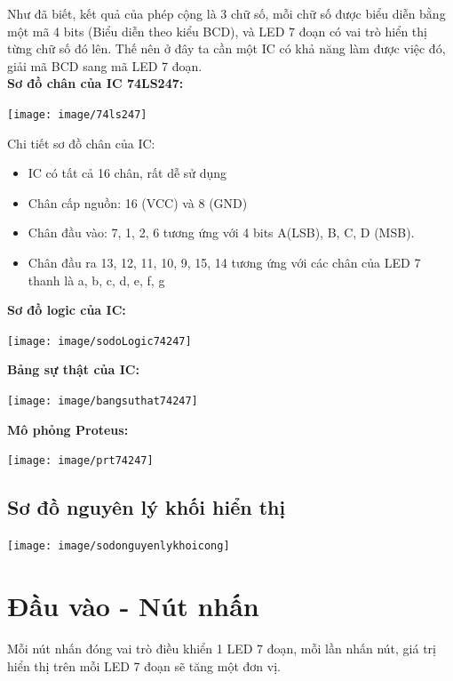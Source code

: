 \documentclass[10pt,a4paper]{report}
\begin{document}
Như đã biết, kết quả của phép cộng là 3 chữ số, mỗi chữ số được biểu diễn bằng một mã 4 bits (Biểu diễn theo kiểu BCD), và LED 7 đoạn có vai trò hiển thị từng chữ số đó lên. Thế nên ở đây ta cần một IC có khả năng làm được việc đó, giải mã BCD sang mã LED 7 đoạn.\\

\textbf{Sơ đồ chân của IC 74LS247:}
\begin{center}
	\texttt{[image: image/74ls247]}
\end{center}

Chi tiết sơ đồ chân của IC:
\begin{itemize}
	\item IC có tất cả 16 chân, rất dễ sử dụng
	\item Chân cấp nguồn: 16 (VCC) và 8 (GND)
	\item Chân đầu vào: 7, 1, 2, 6 tương ứng với 4 bits A(LSB), B, C, D (MSB).
	\item Chân đầu ra 13, 12, 11, 10, 9, 15, 14 tương ứng với các chân của LED 7 thanh là a, b, c, d, e, f, g
\end{itemize}

\textbf{Sơ đồ logic của IC: }
\begin{center}
	\texttt{[image: image/sodoLogic74247]}
\end{center}

\textbf{Bảng sự thật của IC:}
\begin{center}
	\texttt{[image: image/bangsuthat74247]}
\end{center}

\textbf{Mô phỏng Proteus: }
\begin{center}
	\texttt{[image: image/prt74247]}
\end{center}
\subsection{Sơ đồ nguyên lý khối hiển thị}
\begin{center}
	\texttt{[image: image/sodonguyenlykhoicong]}
\end{center}


\newpage
\section{Đầu vào - Nút nhấn}
\hspace{0.3cm} Mỗi nút nhấn đóng vai trò điều khiển 1 LED 7 đoạn, mỗi lần nhấn nút, giá trị hiển thị trên mỗi LED 7 đoạn sẽ tăng một đơn vị.\\
\end{document}

